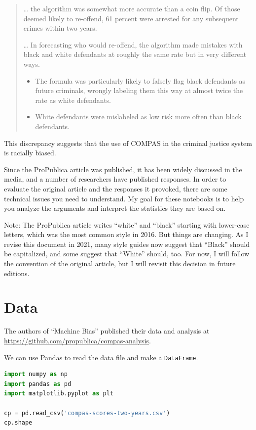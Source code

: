 \begin{quote}
\ldots{} the algorithm was somewhat more accurate than a coin flip. Of
those deemed likely to re-offend, 61 percent were arrested for any
subsequent crimes within two years.

\ldots{} In forecasting who would re-offend, the algorithm made mistakes
with black and white defendants at roughly the same rate but in very
different ways.

\begin{itemize}
\item
  The formula was particularly likely to falsely flag black defendants
  as future criminals, wrongly labeling them this way at almost twice
  the rate as white defendants.
\item
  White defendants were mislabeled as low risk more often than black
  defendants.
\end{itemize}
\end{quote}

This discrepancy suggests that the use of COMPAS in the criminal justice
system is racially biased.

Since the ProPublica article was published, it has been widely discussed
in the media, and a number of researchers have published responses. In
order to evaluate the original article and the responses it provoked,
there are some technical issues you need to understand. My goal for
these notebooks is to help you analyze the arguments and interpret the
statistics they are based on.

Note: The ProPublica article writes ``white'' and ``black'' starting
with lower-case letters, which was the most common style in 2016. But
things are changing. As I revise this document in 2021, many style
guides now suggest that ``Black'' should be capitalized, and some
suggest that ``White'' should, too. For now, I will follow the
convention of the original article, but I will revisit this decision in
future editions.

\hypertarget{data}{%
\section{Data}\label{data}}

The authors of ``Machine Bias'' published their data and analysis at
\url{https://github.com/propublica/compas-analysis}.

We can use Pandas to read the data file and make a
\passthrough{\lstinline!DataFrame!}.

\begin{lstlisting}[language=Python]
import numpy as np
import pandas as pd
import matplotlib.pyplot as plt

cp = pd.read_csv('compas-scores-two-years.csv')
cp.shape
\end{lstlisting}

